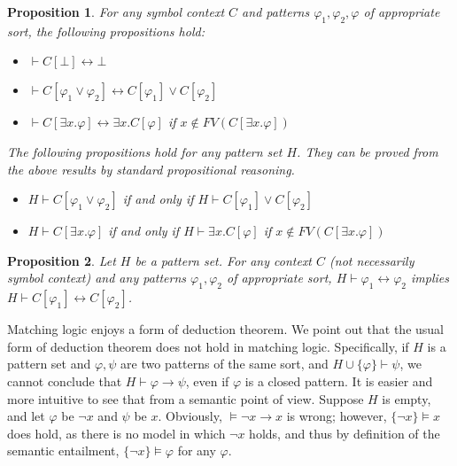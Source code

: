 \documentclass[letter,12pt]{article}
\newtheorem{proposition}{Proposition}
\newcommand{\imp}{\to}
\newcommand{\dimp}{\leftrightarrow}
\newcommand{\FV}{\mathit{FV}}
\begin{document}
\begin{proposition}
\label{prop_propgation_of_symbol_application}
For any symbol context $C$ and patterns $\varphi_1, \varphi_2, \varphi$
of appropriate sort,
the following propositions hold:
\begin{itemize}
\item $ \vdash 
          C[\bot] \dimp 
          \bot$
\item $ \vdash 
          C[\varphi_1 \vee \varphi_2] \dimp
          C[\varphi_1] \vee
          C[\varphi_2]$
\item $ \vdash
          C[\exists x . \varphi] \dimp
          \exists x . C[\varphi] $
       \quad if $x \not\in \FV(C[\exists x . \varphi])$
\end{itemize}
The following propositions hold for any pattern set $H$.
They can be proved from the above results
by standard propositional reasoning.
\begin{itemize}
\item $H \vdash 
          C[\varphi_1 \vee \varphi_2]$
      if and only if
      $H \vdash C[\varphi_1] \vee
                     C[\varphi_2]$
\item $H \vdash
          C[\exists x . \varphi] $
      if and only if
      $H \vdash \exists x . C[\varphi]$
      \quad if $x \not\in \FV(C[\exists x . \varphi])$
\end{itemize}
\end{proposition}

\begin{proposition}
\label{prop_congruence_provability_equiv}
Let $H$ be a pattern set.
For any context $C$ (not necessarily symbol context)
and any patterns $\varphi_1, \varphi_2$ of appropriate sort,
$H \vdash \varphi_1 \dimp \varphi_2$
implies
$H \vdash C[\varphi_1] \dimp C[\varphi_2]$.
\end{proposition}

Matching logic enjoys a form of deduction theorem.
We point out that the usual form of deduction theorem does not hold
in matching logic.
Specifically, if $H$ is a pattern set
and $\varphi,\psi$ are two patterns of the same sort,
and $H \cup \{\varphi\} \vdash \psi$,
we cannot conclude that
$H \vdash \varphi \imp \psi$,
even if $\varphi$ is a closed pattern.
It is easier and more intuitive to see that from a semantic point of view.
Suppose $H$ is empty,
and let $\varphi$ be $\neg x$ and $\psi$ be $x$.
Obviously, $\vDash \neg x \imp x$ is wrong;
however, $\{\neg x\} \vDash x$ does hold,
as there is no model in which $\neg x$ holds,
and thus by definition of the semantic entailment, 
$\{\neg x\} \vDash \varphi$ for any $\varphi$.
\end{document}
